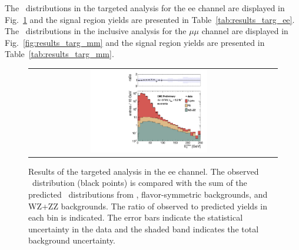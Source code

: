 \clearpage

The \MET\ distributions in the targeted analysis for the ee channel are displayed in Fig.~\ref{fig:results_targ_ee} and 
the signal region yields are presented in Table~\ref{tab:results_targ_ee}.
The \MET\ distributions in the inclusive analysis for the $\mu\mu$ channel are displayed in Fig.~\ref{fig:results_targ_mm} and 
the signal region yields are presented in Table~\ref{tab:results_targ_mm}.

\begin{figure}[!h]
\begin{center}
\begin{tabular}{cc}
\includegraphics[width=0.5\textwidth]{plots/pfmet_bvetoMedium_ee_92fb.pdf}
\end{tabular}
\caption{Results of the targeted analysis in the ee channel. The observed \MET\ distribution (black points) is compared with the sum of the predicted \MET\
distributions from \zjets, flavor-symmetric backgrounds, and WZ+ZZ backgrounds. The ratio of observed to predicted yields in each bin is
indicated. The error bars indicate the statistical uncertainty in the data and the shaded band indicates the total background uncertainty.
\label{fig:results_targ_ee}
}
\end{center}
\end{figure}




